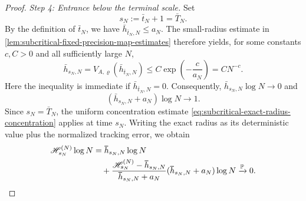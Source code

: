 \documentclass[11pt,reqno,a4paper]{article}
\newcommand{\Pp}{\P}
\begin{document}
\begin{proof}
  \emph{Step 4: Entrance below the terminal scale.}
  Set
  \begin{equation*}
    s_N:=\bar t_N+1=\bar T_N.
  \end{equation*}
  By the definition of $\bar t_N$, we have
  $\bar h_{\bar t_N,N}\leq a_N$. The small-radius estimate in
  \cref{lem:subcritical-fixed-precision-map-estimates} therefore yields,
  for some constants $c,C>0$ and all sufficiently large $N$,
  \begin{equation*}
    \bar h_{s_N,N}
    =
    V_{A,\varrho}(\bar h_{\bar t_N,N})
    \leq
    C\exp\left(-\frac{c}{a_N}\right)
    =
    CN^{-c} .
  \end{equation*}
  Here the inequality is immediate if $\bar h_{\bar t_N,N}=0$. Consequently,
  $\bar h_{s_N,N}\log N\to0$ and
  \begin{equation*}
    (\bar h_{s_N,N}+a_N)\log N\to1 .
  \end{equation*}
  Since $s_N=\bar T_N$, the uniform concentration estimate
  \cref{eq:subcritical-exact-radius-concentration} applies at time $s_N$.
  Writing the exact radius as its deterministic value plus the normalized
  tracking error, we obtain
  \begin{equation*}
    \begin{split}
      \mathscr H_{s_N}^{(N)}\log N
      &=
      \bar h_{s_N,N}\log N
      \\
      &\quad+
      \frac{
        \mathscr H_{s_N}^{(N)}-\bar h_{s_N,N}
      }{
        \bar h_{s_N,N}+a_N
      }
      (\bar h_{s_N,N}+a_N)\log N
      \xrightarrow{\Pp}0 .
    \end{split}
  \end{equation*}


\end{proof}
\end{document}
